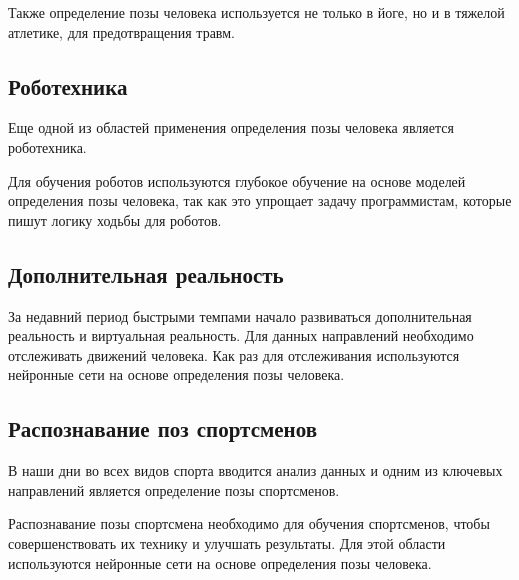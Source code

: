 Также определение позы человека используется не только в йоге, но и в тяжелой атлетике, для предотвращения травм.

\subsection{Роботехника}

Еще одной из областей применения определения позы человека является роботехника.

Для обучения роботов используются глубокое обучение на основе моделей определения позы человека, так как это упрощает задачу программистам, которые пишут логику ходьбы для роботов. 

\subsection{Дополнительная реальность}

За недавний период быстрыми темпами начало развиваться дополнительная реальность и виртуальная реальность. Для данных направлений необходимо отслеживать движений человека. Как раз для отслеживания используются нейронные сети на основе определения позы человека.

\subsection{Распознавание поз спортсменов}

В наши дни во всех видов спорта вводится анализ данных и одним из ключевых направлений является определение позы спортсменов.

Распознавание позы спортсмена необходимо для обучения спортсменов, чтобы совершенствовать их технику и улучшать результаты. Для этой области используются нейронные сети на основе определения позы человека.